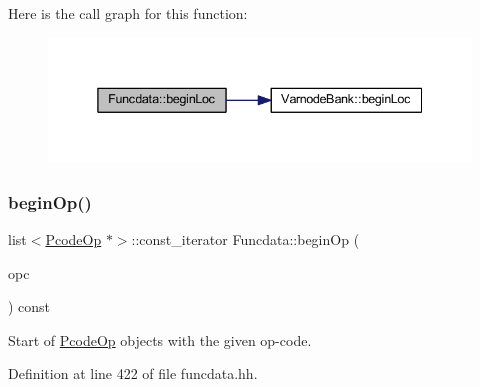 Here is the call graph for this function\+:
\nopagebreak
\begin{figure}[H]
\begin{center}
\leavevmode
\includegraphics[width=338pt]{class_funcdata_a1ad396df61c154668d1f768918b46254_cgraph}
\end{center}
\end{figure}
\mbox{\label{class_funcdata_a47de4c82b4a74b356153eb8e4215f639}} 
\subsubsection{\texorpdfstring{beginOp()}{beginOp()}\hspace{0.1cm}{\footnotesize\ttfamily [1/2]}}
{\footnotesize\ttfamily list$<$\mbox{\hyperlink{class_pcode_op}{Pcode\+Op}} $\ast$$>$\+::const\+\_\+iterator Funcdata\+::begin\+Op (\begin{DoxyParamCaption}\item[{\mbox{\hyperlink{opcodes_8hh_abeb7dfb0e9e2b3114e240a405d046ea7}{Op\+Code}}}]{opc }\end{DoxyParamCaption}) const\hspace{0.3cm}{\ttfamily [inline]}}



Start of \mbox{\hyperlink{class_pcode_op}{Pcode\+Op}} objects with the given op-\/code. 



Definition at line 422 of file funcdata.\+hh.

